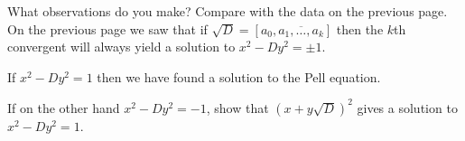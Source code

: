 \documentclass[12pt]{exam}
\begin{document}
\begin{questions}
  What observations do you make? Compare with the data on the previous page.
  \newpage
  \question On the previous page we saw that if $\sqrt{D}=[a_0,\overline{a_1,\ldots,a_k}]$ then the $k$th convergent will always yield a solution to $x^2-Dy^2=\pm1$.
  
  If $x^2-Dy^2=1$ then we have found a solution to the Pell equation.
  
  If on the other hand $x^2-Dy^2=-1$, show that $(x+y\sqrt{D})^2$ gives a solution to $x^2-Dy^2=1$.
\end{questions}
\end{document}

